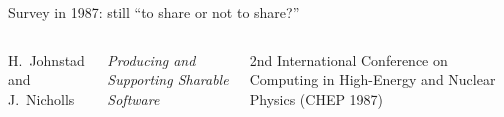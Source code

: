 \documentclass[aspectratio=169]{beamer}
\begin{document}
\begin{frame}{Survey in 1987: still ``to share or not to share?''}
\vspace{0.35 cm}
\begin{columns}

\small
H.\ Johnstad and J.\ Nicholls

\vspace{0.75 cm}
{\it Producing and Supporting Sharable Software}

\vspace{0.75 cm}
2nd International Conference on Computing in High-Energy and Nuclear Physics (CHEP 1987)
\end{columns}
\end{frame}
\end{document}
